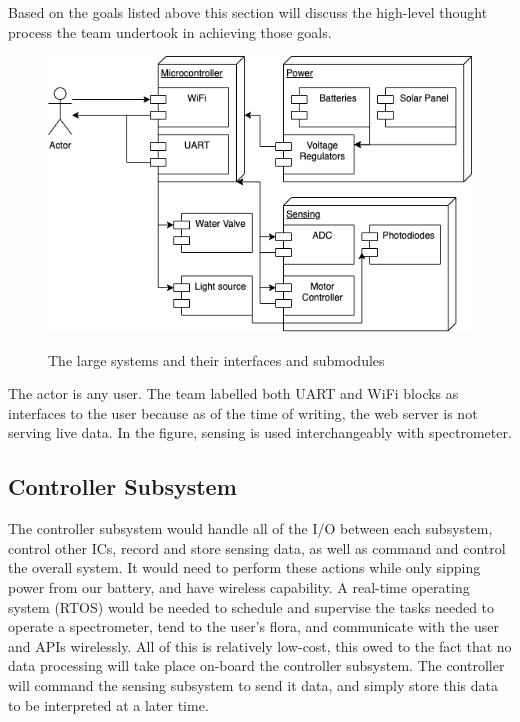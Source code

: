 \documentclass[journal]{IEEEtran}
\begin{document}
Based on the goals listed above this section will discuss the high-level thought
process the team undertook in achieving those goals.
\begin{figure}[H]
	\centering
	\includegraphics[width=\linewidth]{images/Flowchart.png}
	\label{fig:flowchart}
	\caption{The large systems and their interfaces and submodules}
\end{figure}
The actor is any user. The team labelled both UART and WiFi blocks as interfaces to the user
because as of the time of writing, the web server is not serving live data. In the figure, sensing is used 
interchangeably with spectrometer.
\subsection{Controller Subsystem}
The controller subsystem would handle all of the I/O between each subsystem, control other ICs, record and store sensing data, as well as command and control the overall system. It would need to perform these actions while only sipping power from our battery, and have wireless capability. A real-time operating system (RTOS) would be needed to schedule and supervise the tasks needed to operate a spectrometer, tend to the user's flora, and communicate with the user and APIs wirelessly. All of this is relatively low-cost, this owed to the fact that no data processing will take place on-board the controller subsystem. The controller will command the sensing subsystem to send it data, and simply store this data to be interpreted at a later time.
\end{document}
